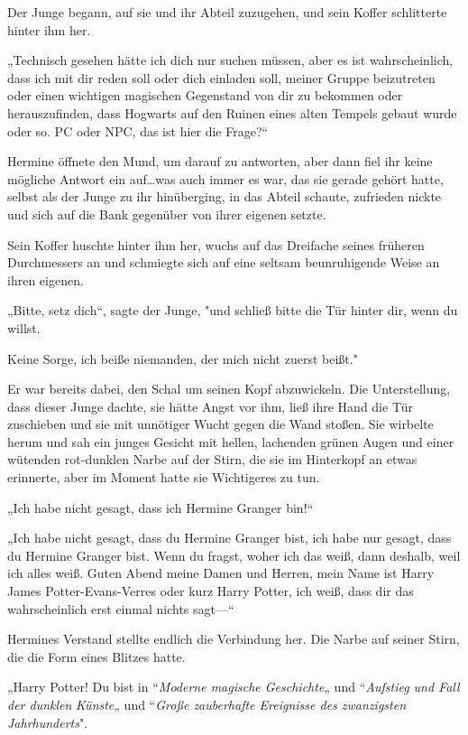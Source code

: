 {Der Junge begann, auf sie und ihr Abteil zuzugehen, und sein Koffer schlitterte hinter ihm her.

„Technisch gesehen hätte ich dich nur suchen müssen, aber es ist wahrscheinlich, dass ich mit dir reden soll oder dich einladen soll, meiner Gruppe beizutreten oder einen wichtigen magischen Gegenstand von dir zu bekommen oder herauszufinden, dass Hogwarts auf den Ruinen eines alten Tempels gebaut wurde oder so. PC oder NPC, das ist hier die Frage?“

Hermine öffnete den Mund, um darauf zu antworten, aber dann fiel ihr keine mögliche Antwort ein auf…was auch immer es war, das sie gerade gehört hatte, selbst als der Junge zu ihr hinüberging, in das Abteil schaute, zufrieden nickte und sich auf die Bank gegenüber von ihrer eigenen setzte.

Sein Koffer huschte hinter ihm her, wuchs auf das Dreifache seines früheren Durchmessers an und schmiegte sich auf eine seltsam beunruhigende Weise an ihren eigenen.

„Bitte, setz dich“, sagte der Junge, "und schließ bitte die Tür hinter dir, wenn du willst.

Keine Sorge, ich beiße niemanden, der mich nicht zuerst beißt."

Er war bereits dabei, den Schal um seinen Kopf abzuwickeln. Die Unterstellung, dass dieser Junge dachte, sie hätte Angst vor ihm, ließ ihre Hand die Tür zuschieben und sie mit unnötiger Wucht gegen die Wand stoßen. Sie wirbelte herum und sah ein junges Gesicht mit hellen, lachenden grünen Augen und einer wütenden rot-dunklen Narbe auf der Stirn, die sie im Hinterkopf an etwas erinnerte, aber im Moment hatte sie Wichtigeres zu tun.

„Ich habe nicht gesagt, dass ich Hermine Granger bin!“

„Ich habe nicht gesagt, dass du Hermine Granger bist, ich habe nur gesagt, dass du Hermine Granger bist. Wenn du fragst, woher ich das weiß, dann deshalb, weil ich alles weiß. Guten Abend meine Damen und Herren, mein Name ist Harry James Potter-Evans-Verres oder kurz Harry Potter, ich weiß, dass dir das wahrscheinlich erst einmal nichts sagt—“

Hermines Verstand stellte endlich die Verbindung her. Die Narbe auf seiner Stirn, die die Form eines Blitzes hatte.

„Harry Potter! Du bist in “\emph{Moderne magische Geschichte}„ und “\emph{Aufstieg und Fall der dunklen} \emph{Künste}„ und “\emph{Große zauberhafte Ereignisse des zwanzigsten Jahrhunderts}".

}
